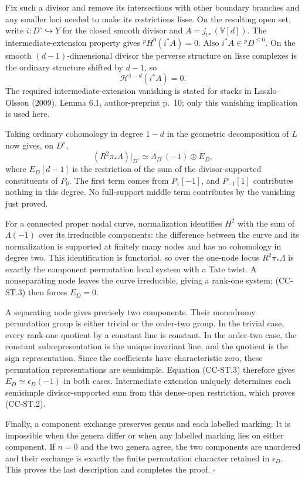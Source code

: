 Fix such a divisor and remove its intersections with other boundary
branches and any smaller loci needed to make its restrictions lisse. On
the resulting open set, write \(i:D^\circ\hookrightarrow Y\) for the
closed smooth divisor and \(A=j_{!*}(\mathbb V[d])\). The
intermediate-extension property gives \({}^pH^0(i^*A)=0\). Also
\(i^*A\in{}^pD^{\leq0}\). On the smooth \((d-1)\)-dimensional divisor
the perverse structure on lisse complexes is the ordinary structure
shifted by \(d-1\), so \[
\mathcal H^{1-d}(i^*A)=0.
\] The required intermediate-extension vanishing is stated for stacks in
Laszlo--Olsson (2009), Lemma 6.1, author-preprint p.~10; only this
vanishing implication is used here.

Taking ordinary cohomology in degree \(1-d\) in the geometric
decomposition of \(L\) now gives, on \(D^\circ\), \[
(R^2\pi_*\Lambda)|_{D^\circ}\simeq
\Lambda_{D^\circ}(-1)\oplus E_D,
\tag{CC-ST.3}
\] where \(E_D[d-1]\) is the restriction of the sum of the
divisor-supported constituents of \(P_0\). The first term comes from
\(P_1[-1]\), and \(P_{-1}[1]\) contributes nothing in this degree. No
full-support middle term contributes by the vanishing just proved.

For a connected proper nodal curve, normalization identifies \(H^2\)
with the sum of \(\Lambda(-1)\) over its irreducible components: the
difference between the curve and its normalization is supported at
finitely many nodes and has no cohomology in degree two. This
identification is functorial, so over the one-node locus
\(R^2\pi_*\Lambda\) is exactly the component permutation local system
with a Tate twist. A nonseparating node leaves the curve irreducible,
giving a rank-one system; (CC-ST.3) then forces \(E_D=0\).

A separating node gives precisely two components. Their monodromy
permutation group is either trivial or the order-two group. In the
trivial case, every rank-one quotient by a constant line is constant. In
the order-two case, the constant subrepresentation is the unique
invariant line, and the quotient is the sign representation. Since the
coefficients have characteristic zero, these permutation representations
are semisimple. Equation (CC-ST.3) therefore gives
\(E_D\simeq\epsilon_D(-1)\) in both cases. Intermediate extension
uniquely determines each semisimple divisor-supported sum from this
dense-open restriction, which proves (CC-ST.2).

Finally, a component exchange preserves genus and each labelled marking.
It is impossible when the genera differ or when any labelled marking
lies on either component. If \(n=0\) and the two genera agree, the two
components are unordered and their exchange is exactly the finite
permutation character retained in \(\epsilon_D\). This proves the last
description and completes the proof. \(\square\)

